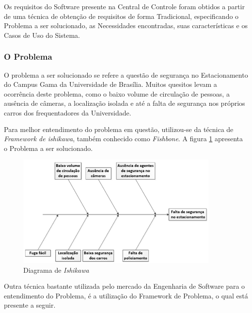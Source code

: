 Os requisitos do Software presente na Central de Controle foram obtidos a partir de uma técnica de obtenção de requisitos de forma Tradicional, especificando o Problema a ser solucionado, as Necessidades encontradas, suas características e os Casos de Uso do Sistema.

\subsubsection{O Problema}

	O problema a ser solucionado se refere a questão de segurança no Estacionamento do Campus Gama da Universidade de Brasília. Muitos quesitos levam a ocorrência deste problema, como o baixo volume de circulação de pessoas, a ausência de câmeras, a localização isolada e até a falta de segurança nos próprios carros dos frequentadores da Universidade.

	Para melhor entendimento do problema em questão, utilizou-se da técnica de \textit{Framework de ishikawa}, também conhecido como \textit{Fishbone}. A figura \ref{img:fishbone} apresenta o Problema a ser solucionado.

	\begin{figure}[H]
		\centering
		\includegraphics[width=0.9\textwidth]{figuras/fishbone}
		\caption{Diagrama de \textit{Ishikawa} }
		\label{img:fishbone}
	\end{figure}

	Outra técnica bastante utilizada pelo mercado da Engenharia de Software para o entendimento do Problema, é a utilização do Framework de Problema, o qual está presente a seguir.

